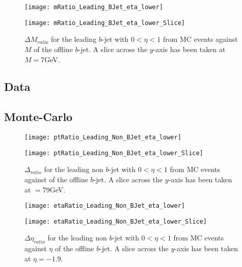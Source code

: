 		\begin{figure}[h]
			\centering

			\begin{minipage}[h]{0.33\linewidth}
				\texttt{[image: mRatio\_Leading\_BJet\_eta\_lower]}
			\end{minipage}
			\quad
			\begin{minipage}[h]{0.33\linewidth}
				\texttt{[image: mRatio\_Leading\_BJet\_eta\_lower\_Slice]}
			\end{minipage}
			\caption{$\Delta M_{ratio}$ for the leading \pt $b$-jet with $0 < \eta < 1$ from MC events against $M$ of the offline $b$-jet. A slice across the $y$-axis has been taken at $M=7$GeV. }
			\label{fig:MC:leadingbmcentral}
		\end{figure}

		\subsection{Data}

		\subsection{Monte-Carlo}

		\begin{figure}[h]
			\centering
			\begin{minipage}[h]{0.33\linewidth}
				\texttt{[image: ptRatio\_Leading\_Non\_BJet\_eta\_lower]}

			\end{minipage}
			\quad
			\begin{minipage}[h]{0.33\linewidth}
				\texttt{[image: ptRatio\_Leading\_Non\_BJet\_eta\_lower\_Slice]}
			\end{minipage}
			\caption{$\Delta $\pt$_{ratio}$ for the leading \pt non $b$-jet with $0 < \eta < 1$ from MC events against \pt of the offline $b$-jet. A slice across the $y$-axis has been taken at \pt$=79$GeV. }
			\label{fig:MC:leadingnonbptcentral}
		\end{figure}

		\begin{figure}[h]
			\centering

			\begin{minipage}[h]{0.33\linewidth}
				\texttt{[image: etaRatio\_Leading\_Non\_BJet\_eta\_lower]}
			\end{minipage}
			\quad
			\begin{minipage}[h]{0.33\linewidth}
				\texttt{[image: etaRatio\_Leading\_Non\_BJet\_eta\_lower\_Slice]}
			\end{minipage}
			\caption{$\Delta \eta_{ratio}$ for the leading \pt non $b$-jet with $0 < \eta < 1$ from MC events against $\eta$ of the offline $b$-jet. A slice across the $y$-axis has been taken at $\eta=-1.9$. }
			\label{fig:MC:leadingnonbetacentral}
		\end{figure}

